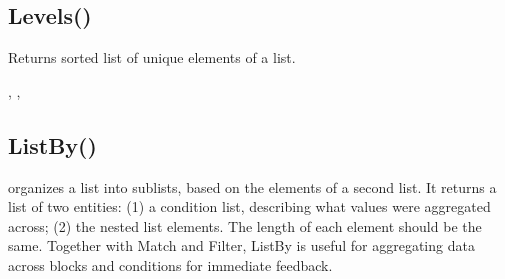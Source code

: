 \documentclass[letterpaper,10pt,english]{sphinxmanual}
\begin{document}
\ignorespaces 

\subsection{Levels()}
\label{\detokenize{reference/design:levels}}\label{\detokenize{reference/design:index-10}}
\sphinxAtStartPar
{}

\sphinxAtStartPar
{}

\sphinxAtStartPar
Returns sorted list of unique elements of a list.

\sphinxAtStartPar
{}

\begin{sphinxVerbatim}[commandchars=\\\{\}]
\end{sphinxVerbatim}

\sphinxAtStartPar
{}

\begin{sphinxVerbatim}[commandchars=\\\{\}]
\PYG{p}{[}\PYG{p}{]}
\end{sphinxVerbatim}

\sphinxAtStartPar
{}

\sphinxAtStartPar
{}, , 

\ignorespaces 

\subsection{ListBy()}
\label{\detokenize{reference/design:listby}}\label{\detokenize{reference/design:index-11}}
\sphinxAtStartPar
{}

\sphinxAtStartPar
{}

\sphinxAtStartPar
organizes a list into sublists, based on the   elements of a second list.  It returns a list of two entities: (1) a   condition list, describing what values were aggregated across; (2)   the nested list elements.  The length of each element should be the same.  Together with Match and Filter, ListBy is useful for aggregating data across blocks and conditions for immediate feedback.
\end{document}

